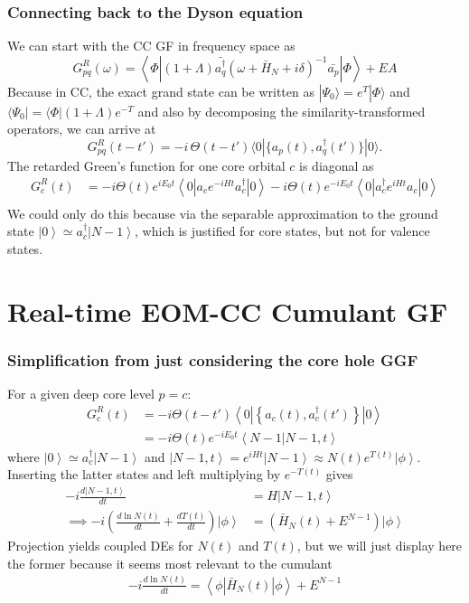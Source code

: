 \begin{frame}
    \frametitle{Connecting back to the Dyson equation}
\color{orange}
We can start with the CC GF in frequency space as
\begin{equation}
    G_{pq}^R (\omega) = \left\langle \Phi \left| (1+\Lambda) \bar{a^{\dagger}_q}(\omega + \bar{H}_N + i\delta)^{-1} \bar{a_p} \right| \Phi \right\rangle + EA
\end{equation}
Because in CC, the exact grand state can be written as $|\Psi_0\rangle = e^T |\Phi\rangle$ and $\langle \Psi_0| = \langle \Phi | (1+\Lambda) e^{-T}$ and also by decomposing the similarity-transformed operators, we can arrive at 
\begin{equation}
    G_{pq}^R(t-t') = -i \, \Theta(t-t') 
    \langle 0 | \{ a_p(t), a_q^\dagger(t') \} |0\rangle .
\label{spgf}
\end{equation}
The retarded Green's function for one core orbital $c$ is diagonal as
\begin{align}
    G_{c}^{R}(t) & = -i \Theta(t) e^{iE_0t} \left<0\left| a_c e^{-iHt} a_c^\dagger \right| 0 \right> -i \Theta(t) e^{-iE_0t}\left<0\left| a_c^\dagger e^{iHt} a_c \right| 0 \right> \\
\end{align}
We could only do this because via the separable approximation to the ground state $\left| 0 \right> \simeq a_c^\dagger \left| N-1 \right>$, which is justified for core states, but not for valence states.
\end{frame}
\section{Real-time EOM-CC Cumulant GF}


\begin{frame}
    \frametitle{Simplification from just considering the core hole GGF}
For a given deep core level $p=c$:
\begin{align}
    G_{c}^{R}(t) &= -i \Theta(t-t')
\left<0\left| \left\{a_c(t), a_c^\dagger(t') \right\} \right| 0 \right>\\
&= -i \Theta(t) e^{-iE_0 t} \left<N-1 | N-1, t \right>
\end{align}
where $\left| 0
\right> \simeq a_c^\dagger \left| N-1 \right>$ and $\left| N-1, t \right> =
e^{iHt} \left| N-1 \right>\approx N(t) e^{T(t)} \left| \phi \right>$. Inserting the latter states and left multiplying by $e^{-T(t)}$ gives
\begin{align}
    -i \frac{d\left| N-1, t \right>}{dt} &= H \left| N-1, t \right> \\
\implies -i \left( \frac{d\ln N(t)}{dt} + \frac{d T(t)}{dt} \right) \left| \phi \right>& = \left( \bar{H}_N(t) + E^{N-1} \right) \left| \phi \right>
\end{align}
Projection yields coupled DEs for $N(t)$ and $T(t)$, but we will just display here the former because it seems most relevant to the cumulant
\begin{align}
\label{eq-dlnndt}
-i \frac{d \ln N(t)}{dt} = \left< \phi \left| \bar{H}_N(t) \right| \phi \right>
+ E^{N-1}
\end{align}


\end{frame}

